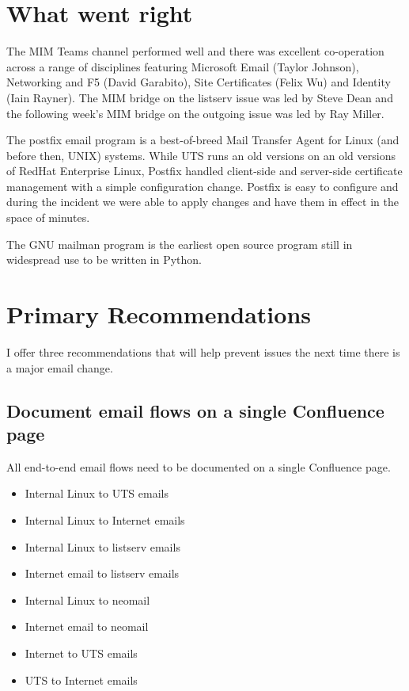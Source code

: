 \documentclass{article}
\begin{document}

\section{What went right}

The MIM Teams channel performed well and there was excellent
co-operation across a range of disciplines featuring Microsoft Email
(Taylor Johnson), Networking and F5 (David Garabito), Site
Certificates (Felix Wu) and Identity (Iain Rayner).
The MIM bridge on the listserv issue was led by Steve Dean and the
following week's MIM bridge on the outgoing issue was led by Ray
Miller.

The postfix email program is a best-of-breed Mail Transfer Agent for
Linux (and before then, UNIX) systems. While UTS runs an old versions on
an old versions of RedHat Enterprise Linux, Postfix handled
client-side and server-side certificate management with a simple
configuration change. Postfix is easy to configure and during the
incident we were able to apply changes and have them in effect in the
space of minutes.

The GNU mailman program is the earliest open source program still in
widespread use to be written in Python. 

\section{Primary Recommendations}

I offer three recommendations that will help prevent issues the next
time there is a major email change.

\subsection{Document email flows on a single Confluence page}

All end-to-end email flows need to be documented on a single
Confluence page.

\begin{itemize}
  \item Internal Linux to UTS emails
  \item Internal Linux to Internet emails
  \item Internal Linux to listserv emails
  \item Internet email to listserv emails
  \item Internal Linux to neomail
  \item Internet email to neomail
  \item Internet to UTS emails
  \item UTS to Internet emails
\end{itemize}
\end{document}
